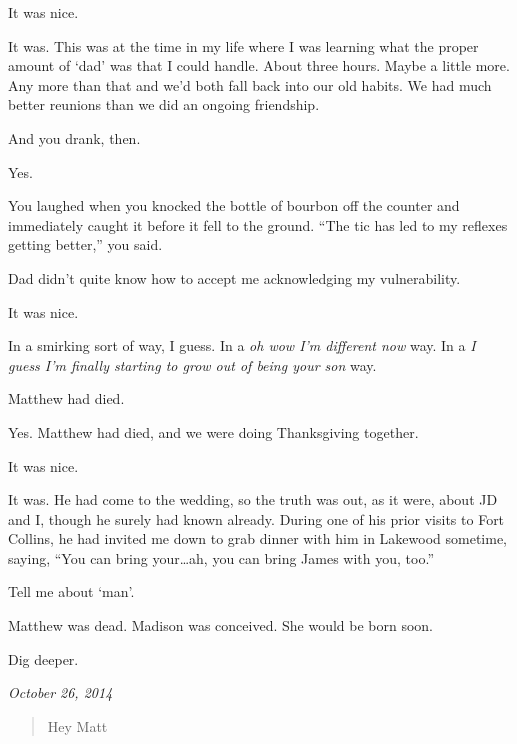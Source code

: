 \begin{paracol}{2}
\begin{leftcolumn}
\begin{ally}
It was nice.
\end{ally}
It was. This was at the time in my life where I was learning what the proper amount of `dad' was that I could handle. About three hours. Maybe a little more. Any more than that and we'd both fall back into our old habits. We had much better reunions than we did an ongoing friendship.

\begin{ally}
And you drank, then.
\end{ally}
Yes.

\begin{ally}
You laughed when you knocked the bottle of bourbon off the counter and immediately caught it before it fell to the ground. ``The tic has led to my reflexes getting better,'' you said.
\end{ally}
Dad didn't quite know how to accept me acknowledging my vulnerability.

\begin{ally}
It was nice.
\end{ally}
In a smirking sort of way, I guess. In a \emph{oh wow I'm different now} way. In a \emph{I guess I'm finally starting to grow out of being your son} way.

\begin{ally}
Matthew had died.
\end{ally}
Yes. Matthew had died, and we were doing Thanksgiving together.

\begin{ally}
It was nice.
\end{ally}
It was. He had come to the wedding, so the truth was out, as it were, about JD and I, though he surely had known already. During one of his prior visits to Fort Collins, he had invited me down to grab dinner with him in Lakewood sometime, saying, ``You can bring your\ldots{}ah, you can bring James with you, too.''

\begin{ally}
Tell me about `man'.
\end{ally}
Matthew was dead. Madison was conceived. She would be born soon.

\begin{ally}
Dig deeper.
\end{ally}
\newpage
\end{leftcolumn}
\begin{rightcolumn*}
\emph{October 26, 2014}
\end{rightcolumn*}
\begin{leftcolumn}
\begin{quotation}
Hey Matt


\end{quotation}
\end{leftcolumn}
\end{paracol}
